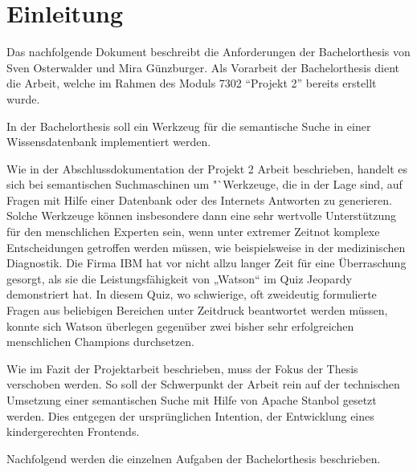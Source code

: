 \chapter{Einleitung}
\label{chap:einleitung}

Das nachfolgende Dokument beschreibt die Anforderungen der Bachelorthesis von Sven Osterwalder und Mira Günzburger. Als Vorarbeit der Bachelorthesis dient die Arbeit, welche im Rahmen des Moduls 7302 "`Projekt 2"' bereits erstellt wurde.

In der Bachelorthesis soll ein Werkzeug für die semantische Suche in einer Wissensdatenbank implementiert werden.

Wie in der Abschlussdokumentation der Projekt 2 Arbeit beschrieben, handelt es sich bei semantischen  Suchmaschinen um "`Werkzeuge, die in der Lage sind, auf Fragen mit Hilfe einer Datenbank oder des Internets Antworten zu generieren. Solche Werkzeuge können insbesondere dann eine sehr wertvolle Unterstützung für den menschlichen Experten sein, wenn unter extremer Zeitnot komplexe Entscheidungen getroffen werden müssen, wie beispielsweise in der medizinischen Diagnostik. Die Firma IBM hat vor nicht allzu langer Zeit für eine Überraschung gesorgt, als sie die Leistungsfähigkeit von „Watson“ im Quiz Jeopardy demonstriert hat. In diesem Quiz, wo schwierige, oft zweideutig formulierte Fragen aus beliebigen Bereichen unter Zeitdruck beantwortet werden müssen, konnte sich Watson überlegen gegenüber zwei bisher sehr erfolgreichen menschlichen Champions durchsetzen.
\cite{projekt2Doc}

Wie im Fazit der Projektarbeit beschrieben, muss der Fokus der Thesis verschoben werden. So soll der Schwerpunkt der Arbeit rein auf der technischen Umsetzung einer semantischen Suche mit Hilfe von Apache Stanbol gesetzt werden. Dies entgegen der ursprünglichen Intention, der Entwicklung eines kindergerechten Frontends.

Nachfolgend werden die einzelnen Aufgaben der Bachelorthesis beschrieben.

